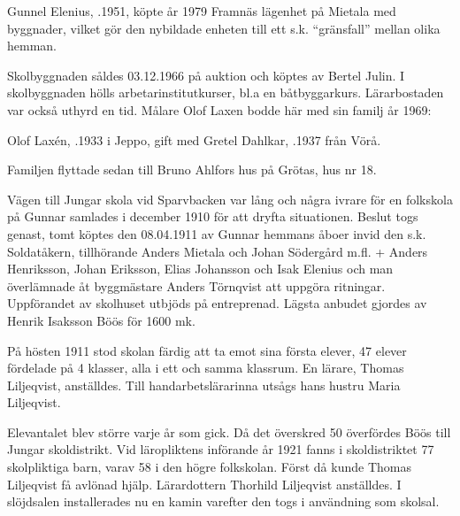%


%
Gunnel Elenius, .1951, köpte år 1979 Framnäs lägenhet på Mietala med byggnader, vilket gör den nybildade enheten till ett s.k. ``gränsfall'' mellan olika hemman.\jhvspace{}


%
Skolbyggnaden såldes 03.12.1966 på auktion och köptes av Bertel Julin. I skolbyggnaden hölls arbetarinstitutkurser, bl.a en båtbyggarkurs. Lärarbostaden var också uthyrd en tid. Målare Olof Laxen bodde här med sin familj år 1969:

Olof Laxén, .1933 i Jeppo, gift med Gretel Dahlkar, .1937 från Vörå.
\begin{jhchildren}
  \item {}
  \item {}
\end{jhchildren}

Familjen flyttade sedan till Bruno Ahlfors hus på Grötas, hus nr 18.


%
Vägen till Jungar skola vid Sparvbacken var lång och några ivrare för en folkskola på Gunnar samlades i december 1910 för att dryfta situationen. Beslut togs genast, tomt köptes den 08.04.1911 av Gunnar hemmans åboer invid den s.k. Soldatåkern, tillhörande Anders Mietala och Johan Södergård m.fl. + Anders Henriksson, Johan Eriksson, Elias Johansson och Isak Elenius och man överlämnade åt byggmästare Anders Törnqvist att uppgöra ritningar. Uppförandet av skolhuset utbjöds på entreprenad. Lägsta anbudet gjordes av Henrik Isaksson Böös för 1600 mk.

På hösten 1911 stod skolan färdig att ta emot sina första elever, 47 elever fördelade på 4 klasser, alla i ett och samma klassrum. En lärare, Thomas Liljeqvist, anställdes. Till handarbetslärarinna utsågs hans hustru Maria Liljeqvist.

Elevantalet blev större varje år som gick. Då det överskred 50 överfördes Böös till Jungar skoldistrikt. Vid läropliktens införande år 1921 fanns i skoldistriktet 77 skolpliktiga barn, varav 58 i den högre folkskolan. Först då kunde Thomas Liljeqvist få avlönad hjälp. Lärardottern Thorhild Liljeqvist anställdes. I slöjdsalen installerades nu en kamin varefter den togs i användning som skolsal.

